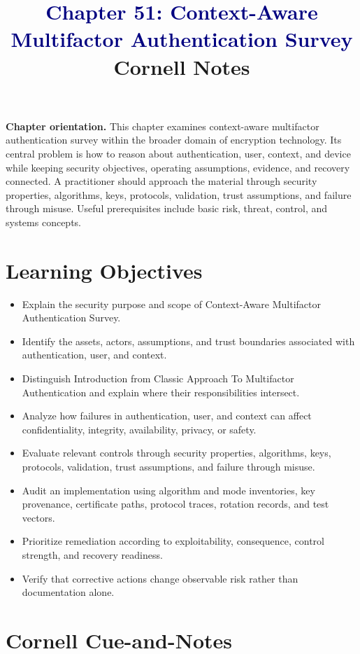 \documentclass[11pt]{article}
\title{\textcolor{Navy}{Chapter 51: Context-Aware Multifactor Authentication Survey}\\[2mm]\large Cornell Notes}
\author{}
\date{}
\begin{document}
\maketitle
\thispagestyle{fancy}
\vspace{-1.5em}
\begin{orientationbox}
\textbf{Chapter orientation.} This chapter examines context-aware multifactor authentication survey within the broader domain of encryption technology. Its central problem is how to reason about authentication, user, context, and device while keeping security objectives, operating assumptions, evidence, and recovery connected. A practitioner should approach the material through security properties, algorithms, keys, protocols, validation, trust assumptions, and failure through misuse. Useful prerequisites include basic risk, threat, control, and systems concepts.
\end{orientationbox}
\section*{Learning Objectives}
\begin{itemize}
\item Explain the security purpose and scope of Context-Aware Multifactor Authentication Survey.
\item Identify the assets, actors, assumptions, and trust boundaries associated with authentication, user, and context.
\item Distinguish Introduction from Classic Approach To Multifactor Authentication and explain where their responsibilities intersect.
\item Analyze how failures in authentication, user, and context can affect confidentiality, integrity, availability, privacy, or safety.
\item Evaluate relevant controls through security properties, algorithms, keys, protocols, validation, trust assumptions, and failure through misuse.
\item Audit an implementation using algorithm and mode inventories, key provenance, certificate paths, protocol traces, rotation records, and test vectors.
\item Prioritize remediation according to exploitability, consequence, control strength, and recovery readiness.
\item Verify that corrective actions change observable risk rather than documentation alone.
\end{itemize}
\section*{Cornell Cue-and-Notes}
\end{document}
